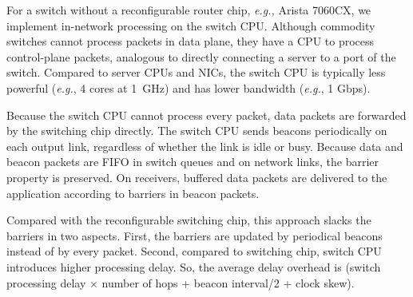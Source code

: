 For a switch without a reconfigurable router chip, \textit{e.g.,} Arista 7060CX, we implement in-network processing on the switch CPU.
Although commodity switches cannot process packets in data plane, they have a CPU to process control-plane packets, analogous to directly connecting a server to a port of the switch.
Compared to server CPUs and NICs, the switch CPU is typically less powerful (\textit{e.g.}, 4 cores at 1~GHz) and has lower bandwidth (\textit{e.g.}, 1 Gbps).

Because the switch CPU cannot process every packet, data packets are forwarded by the switching chip directly.%
The switch CPU sends beacons periodically on each output link, regardless of whether the link is idle or busy.
Because data and beacon packets are FIFO in switch queues and on network links, the barrier property is preserved. On receivers, buffered data packets are delivered to the application according to barriers in beacon packets.

Compared with the reconfigurable switching chip, this approach slacks the barriers in two aspects.
First, the barriers are updated by periodical beacons instead of by every packet.
Second, compared to switching chip, switch CPU introduces higher processing delay.
So, the average delay overhead is (switch processing delay $\times$ number of hops + beacon interval/2 + clock skew).

